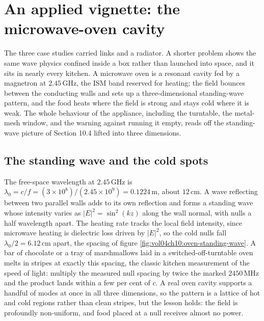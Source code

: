 \section{An applied vignette: the microwave-oven cavity}

The three case studies carried links and a radiator. A shorter problem
shows the same wave physics confined inside a box rather than launched
into space, and it sits in nearly every kitchen. A microwave oven is a
resonant cavity fed by a magnetron at $2.45\,\si{\giga\hertz}$, the ISM
band reserved for heating; the field bounces between the conducting walls
and sets up a three-dimensional standing-wave pattern, and the food heats
where the field is strong and stays cold where it is weak. The whole
behaviour of the appliance, including the turntable, the metal-mesh
window, and the warning against running it empty, reads off the
standing-wave picture of Section 10.4 lifted into three dimensions.

\subsection{The standing wave and the cold spots}

The free-space wavelength at $2.45\,\si{\giga\hertz}$ is $\lambda_0 =
c/f = (3\times 10^{8})/(2.45\times 10^{9}) = 0.1224\,\si{\meter}$, about
$12\,\si{\centi\meter}$. A wave reflecting between two parallel walls
adds to its own reflection and forms a standing wave whose intensity
varies as $|E|^2 = \sin^2(kz)$ along the wall normal, with nulls a half
wavelength apart. The heating rate tracks the local field intensity,
since microwave heating is dielectric loss driven by $|E|^2$, so the cold
nulls fall $\lambda_0/2 = 6.12\,\si{\centi\meter}$ apart, the spacing of
figure \ref{fig:vol04ch10:oven-standing-wave}. A bar of chocolate or a
tray of marshmallows laid in a switched-off-turntable oven melts in
stripes at exactly this spacing, the classic kitchen measurement of the
speed of light: multiply the measured null spacing by twice the marked
$2450\,\si{\mega\hertz}$ and the product lands within a few per cent of
$c$. A real oven cavity supports a handful of modes at once in all three
dimensions, so the pattern is a lattice of hot and cold regions rather
than clean stripes, but the lesson holds: the field is profoundly
non-uniform, and food placed at a null receives almost no power.



